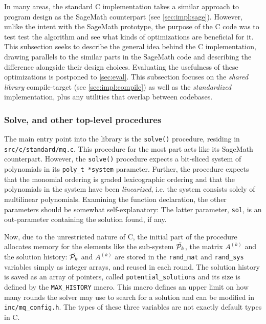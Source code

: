 In many areas, the standard C implementation takes a similar approach to program design as the SageMath counterpart (see \cref{sec:impl:sage}). However, unlike the intent with the SageMath prototype, the purpose of the C code was to test test the algorithm and see what kinds of optimizations are beneficial for it. This subsection seeks to describe the general idea behind the C implementation, drawing parallels to the similar parts in the SageMath code and describing the difference alongside their design choices. Evaluating the usefulness of these optimizations is postponed to \cref{sec:eval}. This subsection focuses on the \textit{shared library} compile-target (see \cref{sec:impl:compile}) as well as the \textit{standardized} implementation, plus any utilities that overlap between codebases.

\subsubsection{Solve, and other top-level procedures} \label{sec:impl:c:solve}
The main entry point into the library is the \texttt{solve()} procedure, residing in \texttt{src/c/standard/mq.c}. This procedure for the most part acts like its SageMath counterpart. However, the \texttt{solve()} procedure expects a bit-sliced system of polynomials in its \texttt{poly\_t *system} parameter. Further, the procedure expects that the monomial ordering is graded lexicographic ordering and that the polynomials in the system have been \textit{linearized}, i.e. the system consists solely of multilinear polynomials. Examining the function declaration, the other parameters should be somewhat self-explanatory:
The latter parameter, \texttt{sol}, is an out-parameter containing the solution found, if any.

Now, due to the unrestricted nature of C, the initial part of the procedure allocates memory for the elements like the sub-system $\Tilde{\mathcal{P}_k}$, the matrix $A^{(k)}$ and the solution history:
$\Tilde{\mathcal{P}_k}$ and $A^{(k)}$ are stored in the \texttt{rand\_mat} and \texttt{rand\_sys} variables simply as integer arrays, and reused in each round. The solution history is saved as an array of pointers, called \texttt{potential\_solutions} and its size is defined by the \texttt{MAX\_HISTORY} macro. This macro defines an upper limit on how many rounds the solver may use to search for a solution and can be modified in \texttt{inc/mq\_config.h}. The types of these three variables are not exactly default types in C.

